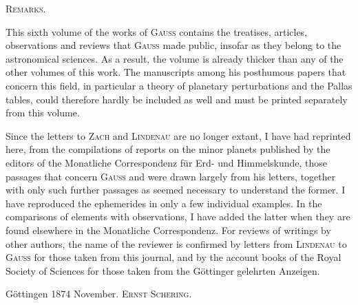 \clearpage
{}
\hypertarget{native-659-lower}{}
\begin{center}\textsc{Remarks.}\end{center}

This sixth volume of the works of \textsc{Gauss} contains the treatises, articles, observations and reviews that \textsc{Gauss} made public, insofar as they belong to the astronomical sciences.
As a result, the volume is already thicker than any of the other volumes of this work.
The manuscripts among his posthumous papers that concern this field, in particular a theory of planetary perturbations and the Pallas tables, could therefore hardly be included as well and must be printed separately from this volume.

Since the letters to \textsc{Zach} and \textsc{Lindenau} are no longer extant, I have had reprinted here, from the compilations of reports on the minor planets published by the editors of the Monatliche Correspondenz für Erd- und Himmelskunde, those passages that concern \textsc{Gauss} and were drawn largely from his letters, together with only such further passages as seemed necessary to understand the former.
I have reproduced the ephemerides in only a few individual examples.
In the comparisons of elements with observations, I have added the latter when they are found elsewhere in the Monatliche Correspondenz.
For reviews of writings by other authors, the name of the reviewer is confirmed by letters from \textsc{Lindenau} to \textsc{Gauss} for those taken from this journal, and by the account books of the Royal Society of Sciences for those taken from the Göttinger gelehrten Anzeigen.

Göttingen 1874 November. \hfill \textsc{Ernst Schering}.
